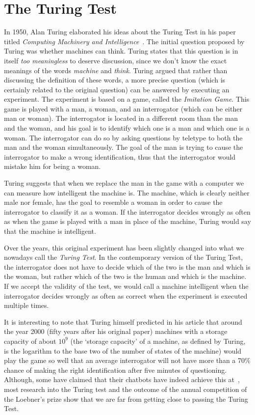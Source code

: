 \section{The Turing Test}
In 1950, Alan Turing elaborated his ideas about the Turing Test in his paper titled \textit{Computing Machinery and Intelligence}~\cite{turing1950computing}. The initial question proposed by Turing was whether machines can think. Turing states that this question is in itself \textit{too meaningless} to deserve discussion, since we don't know the exact meanings of the words \textit{machine} and \textit{think}. Turing argued that rather than discussing the definition of these words, a more precise question (which is certainly related to the original question) can be answered by executing an experiment. The experiment is based on a game, called the \textit{Imitation Game}. This game is played with a man, a woman, and an interrogator (which can be either man or woman). The interrogator is located in a different room than the man and the woman, and his goal is to identify which one is a man and which one is a woman. The interrogator can do so by asking questions by teletype to both the man and the woman simultaneously. The goal of the man is trying to cause the interrogator to make a wrong identification, thus that the interrogator would mistake him for being a woman.

Turing suggests that when we replace the man in the game with a computer we can measure how intelligent the machine is. The machine, which is clearly neither male nor female, has the goal to resemble a woman in order to cause the interrogator to classify it as a woman. If the interrogator decides wrongly as often as when the game is played with a man in place of the machine, Turing would say that the machine is intelligent.

Over the years, this original experiment has been slightly changed into what we nowadays call the \textit{Turing Test}. In the contemporary version of the Turing Test, the interrogator does not have to decide which of the two is the man and which is the woman, but rather which of the two is the human and which is the machine. If we accept the validity of the test, we would call a machine intelligent when the interrogator decides wrongly as often as correct when the experiment is executed multiple times.

It is interesting to note that Turing himself predicted in his article that around the year 2000 (fifty years after his original paper) machines with a storage capacity of about $10^{9}$ (the ‘storage capacity’ of a machine, as defined by Turing, is the logarithm to the base two of the number of states of the machine) would play the game so well that an average interrogator will not have more than a 70\% chance of making the right identification after five minutes of questioning. Although, some have claimed that their chatbots have indeed achieve this at~\cite{copeland2014eugene}, most research into the Turing test and the outcome of the annual competition of the Loebner's prize show that we are far from getting close to passing the Turing Test.

